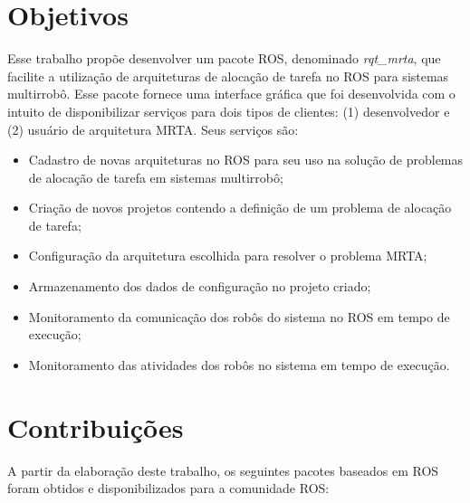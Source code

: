     \section{Objetivos} \label{sec:objetivos}
        Esse trabalho propõe desenvolver um pacote ROS, denominado \textit{rqt\_mrta}, que facilite a utilização de arquiteturas de alocação de tarefa no ROS para sistemas multirrobô. Esse pacote fornece uma interface gráfica que foi desenvolvida com o intuito de disponibilizar serviços para dois tipos de clientes: (1) desenvolvedor e (2) usuário de arquitetura MRTA. Seus serviços são:
        
        \begin{itemize}
            \item Cadastro de novas arquiteturas no ROS para seu uso na solução de problemas de alocação de tarefa em sistemas multirrobô;
            \item Criação de novos projetos contendo a definição de um problema de alocação de tarefa;
            \item Configuração da arquitetura escolhida para resolver o problema MRTA;
            \item Armazenamento dos dados de configuração no projeto criado;
            \item Monitoramento da comunicação dos robôs do sistema no ROS em tempo de execução;
            \item Monitoramento das atividades dos robôs no sistema em tempo de execução.
        \end{itemize}
        
        
    \section{Contribuições} \label{sec:contribuicoes}
        A partir da elaboração deste trabalho, os seguintes pacotes baseados em ROS foram obtidos e disponibilizados para a comunidade ROS:
        
